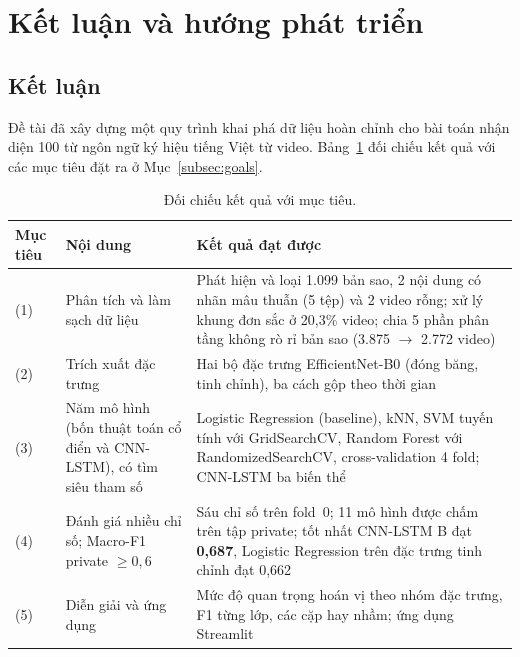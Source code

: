 \section{Kết luận và hướng phát triển}
\label{sec:conclusion}

\subsection{Kết luận}

Đề tài đã xây dựng một quy trình khai phá dữ liệu hoàn chỉnh cho bài toán nhận diện 100 từ ngôn ngữ ký hiệu tiếng Việt từ video. Bảng~\ref{tab:goals_check} đối chiếu kết quả với các mục tiêu đặt ra ở Mục~\ref{subsec:goals}.

\begin{table}[H]
  \centering
  \caption{Đối chiếu kết quả với mục tiêu.}
  \label{tab:goals_check}
  \small
  \begin{tabular}{@{}p{}p{}p{}@{}}
    \toprule
    \textbf{Mục tiêu} & \textbf{Nội dung} & \textbf{Kết quả đạt được} \\
    \midrule
    (1) & Phân tích và làm sạch dữ liệu & Phát hiện và loại 1.099 bản sao, 2 nội dung có nhãn mâu thuẫn (5 tệp) và 2 video rỗng; xử lý khung đơn sắc ở 20,3\% video; chia 5 phần phân tầng không rò rỉ bản sao (3.875 $\rightarrow$ 2.772 video) \\
    (2) & Trích xuất đặc trưng & Hai bộ đặc trưng EfficientNet-B0 (đóng băng, tinh chỉnh), ba cách gộp theo thời gian \\
    (3) & Năm mô hình (bốn thuật toán cổ điển và CNN-LSTM), có tìm siêu tham số & Logistic Regression (baseline), kNN, SVM tuyến tính với GridSearchCV, Random Forest với RandomizedSearchCV, cross-validation 4 fold; CNN-LSTM ba biến thể \\
    (4) & Đánh giá nhiều chỉ số; Macro-F1 private $\ge0{,}6$ & Sáu chỉ số trên fold~0; 11 mô hình được chấm trên tập private; tốt nhất CNN-LSTM B đạt \textbf{0,687}, Logistic Regression trên đặc trưng tinh chỉnh đạt 0,662 \\
    (5) & Diễn giải và ứng dụng & Mức độ quan trọng hoán vị theo nhóm đặc trưng, F1 từng lớp, các cặp hay nhầm; ứng dụng Streamlit %
    \\
    \bottomrule
  \end{tabular}
\end{table}

